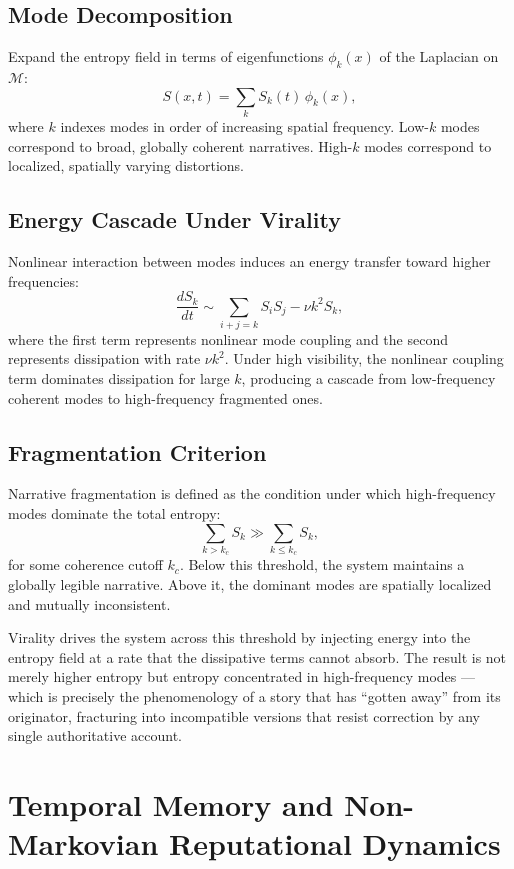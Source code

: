 \documentclass[12pt,a4paper]{article}
\begin{document}
\subsection{Mode Decomposition}

Expand the entropy field in terms of eigenfunctions $\phi_k(x)$ of the Laplacian on $\mathcal{M}$:
\[
S(x,t) = \sum_k S_k(t)\,\phi_k(x),
\]
where $k$ indexes modes in order of increasing spatial frequency. Low-$k$ modes correspond to broad, globally coherent narratives. High-$k$ modes correspond to localized, spatially varying distortions.

\subsection{Energy Cascade Under Virality}

Nonlinear interaction between modes induces an energy transfer toward higher frequencies:
\[
\frac{dS_k}{dt} \sim \sum_{i+j=k} S_i S_j - \nu k^2 S_k,
\]
where the first term represents nonlinear mode coupling and the second represents dissipation with rate $\nu k^2$. Under high visibility, the nonlinear coupling term dominates dissipation for large $k$, producing a cascade from low-frequency coherent modes to high-frequency fragmented ones.

\subsection{Fragmentation Criterion}

Narrative fragmentation is defined as the condition under which high-frequency modes dominate the total entropy:
\[
\sum_{k > k_c} S_k \gg \sum_{k \leq k_c} S_k,
\]
for some coherence cutoff $k_c$. Below this threshold, the system maintains a globally legible narrative. Above it, the dominant modes are spatially localized and mutually inconsistent.

Virality drives the system across this threshold by injecting energy into the entropy field at a rate that the dissipative terms cannot absorb. The result is not merely higher entropy but entropy concentrated in high-frequency modes — which is precisely the phenomenology of a story that has ``gotten away'' from its originator, fracturing into incompatible versions that resist correction by any single authoritative account.

\section{Temporal Memory and Non-Markovian Reputational Dynamics}
\end{document}
